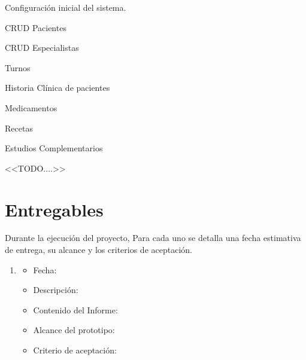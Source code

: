 \documentclass[a4paper, 10pt, oneside]{book}
\begin{document}
    \begin{cronograma}
        \item Configuración inicial del sistema.
        \item CRUD Pacientes
        \item CRUD Especialistas
        \item Turnos
        \item Historia Clínica de pacientes
        \item Medicamentos
        \item Recetas
        \item Estudios Complementarios
        \item <<TODO....>>
    \end{cronograma}

    \section{Entregables}
    \label{sec:entregables}

    Durante la ejecución del proyecto, %
    Para cada uno se detalla una fecha estimativa de entrega, su alcance y los criterios de aceptación.

    \begin{enumerate}
        \item
        \begin{itemize}
            \item Fecha: %
            \item Descripción:
            \item Contenido del Informe:
            \item Alcance del prototipo:
            \item Criterio de aceptación:
        \end{itemize}
    \end{enumerate}
\end{document}
